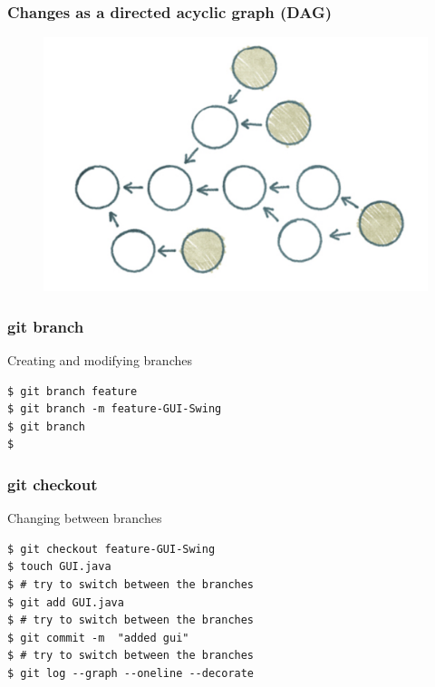 \documentclass{beamer}
\begin{document}
\begin{frame}
\frametitle{Changes as a directed acyclic graph (DAG)}

\begin{figure}
\includegraphics[scale=0.3]{figures/f12.png}
\end{figure}

\end{frame}


\begin{frame}[fragile]
\frametitle{git branch}

Creating and modifying branches

\begin{lstlisting}
$ git branch feature 
$ git branch -m feature-GUI-Swing
$ git branch 
$
\end{lstlisting}
\end{frame}


\begin{frame}[fragile]
\frametitle{git checkout}

Changing between branches

\begin{lstlisting}
$ git checkout feature-GUI-Swing
$ touch GUI.java
$ # try to switch between the branches
$ git add GUI.java
$ # try to switch between the branches
$ git commit -m  "added gui"
$ # try to switch between the branches
$ git log --graph --oneline --decorate
\end{lstlisting}
\end{frame}
\end{document}
